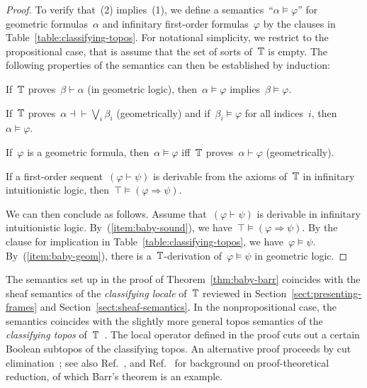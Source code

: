 \documentclass{ws-rv9x6}
\begin{document}
{\begin{proof}
To verify that~(2) implies~(1), we define a semantics~``$\alpha \models
\varphi$'' for geometric formulas~$\alpha$ and infinitary first-order
formulas~$\varphi$ by the clauses in Table~\ref{table:classifying-topos}. For
notational simplicity, we restrict to the propositional case, that is assume that the set of
sorts of~$\mathbb{T}$ is empty.
The following properties of the semantics can then be established by induction:
\begin{alphlist}[(d)]
\item If~$\mathbb{T}$ proves~$\beta \vdash \alpha$ (in geometric logic), then~$\alpha \models \varphi$ implies~$\beta
\models \varphi$.
\item If~$\mathbb{T}$ proves~$\alpha \dashv\vdash \bigvee_i \beta_i$ (geometrically) and if~$\beta_i \models \varphi$ for
all indices~$i$, then~$\alpha \models \varphi$.
\item\label{item:baby-geom} If~$\varphi$ is a geometric formula, then~$\alpha
\models \varphi$ iff~$\mathbb{T}$ proves~$\alpha \vdash \varphi$ (geometrically).
\item\label{item:baby-sound} If a first-order sequent~$(\varphi \vdash \psi)$
is derivable from the axioms of~$\mathbb{T}$ in infinitary intuitionistic logic,
then~$\top \models (\varphi \Rightarrow \psi)$.
\end{alphlist}
We can then conclude as follows. Assume that~$(\varphi \vdash \psi)$
is derivable in infinitary intuitionistic logic. By~(\ref{item:baby-sound}), we
have~$\top \models (\varphi \Rightarrow \psi)$. By the clause for implication
in Table~\ref{table:classifying-topos}, we have~$\varphi \models \psi$.
By~(\ref{item:baby-geom}), there is a~$\mathbb{T}$-derivation of~$\varphi \models
\psi$ in geometric logic.
\end{proof}

\begin{remark}The semantics set up in the proof of Theorem~\ref{thm:baby-barr}
coincides with the sheaf semantics of the \emph{classifying locale} of~$\mathbb{T}$
reviewed in Section~\ref{sect:presenting-frames} and
Section~\ref{sect:sheaf-semantics}. In the nonpropositional case, the semantics
coincides with the slightly more general topos semantics of the
\emph{classifying topos} of~$\mathbb{T}$~\cite[Section~2]{caramello:tst}. The local
operator defined in the proof cuts out a certain Boolean subtopos of the
classifying topos. An alternative proof proceeds by cut
elimination~\cite[Section~6]{rathjen:barr}; see also
Ref.~, and
Ref.~ for background on proof-theoretical
reduction, of which Barr's theorem is an example.
\end{remark}

}
\end{document}
